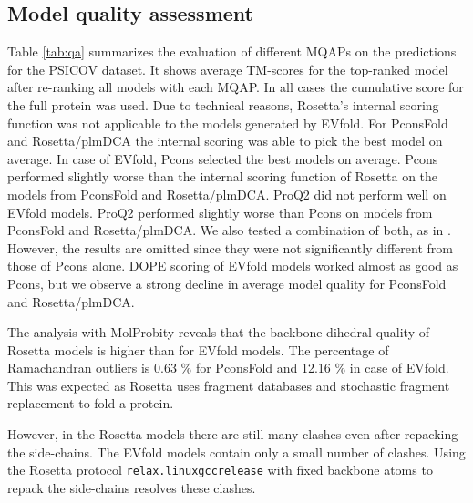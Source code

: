 \documentclass{bioinfo}
\begin{document}
\subsection{Model quality assessment}
Table \ref{tab:qa} summarizes the evaluation of different MQAPs on the
predictions for the PSICOV dataset. It shows average TM-scores for the
top-ranked model after re-ranking all models with each MQAP. In all
cases the cumulative score for the full protein was used. Due to
technical reasons, Rosetta's internal scoring function was not
applicable to the models generated by EVfold. For PconsFold and
Rosetta/plmDCA the internal scoring was able to pick the best model on
average. In case of EVfold, Pcons selected the best models on
average. Pcons performed slightly worse than the internal scoring
function of Rosetta on the models from PconsFold and
Rosetta/plmDCA. ProQ2 did not perform well on EVfold models. ProQ2 performed slightly worse than
Pcons on models from PconsFold and Rosetta/plmDCA. We also tested a
combination of both, as in \citeauthor{wallner_pcons.net:_2007}
\citeyear{wallner_pcons.net:_2007}. However, the results are omitted
since they were not significantly different from those of Pcons
alone. DOPE scoring of EVfold models worked almost as good as Pcons,
but we observe a strong decline in average model quality for PconsFold
and Rosetta/plmDCA.  



The analysis with MolProbity reveals that the backbone dihedral 
quality of Rosetta models is higher than for EVfold models. 
The percentage of Ramachandran outliers is 0.63 \% for PconsFold and 
12.16 \% in case of EVfold. This was expected as Rosetta uses fragment
databases and stochastic fragment replacement to fold a protein.


However, in the Rosetta models there are still many clashes even 
after repacking the side-chains. The EVfold models contain only a 
small number of clashes. Using the Rosetta protocol 
{\tt relax.linuxgccrelease} with fixed backbone atoms to repack the 
side-chains resolves these clashes. 
\end{document}
